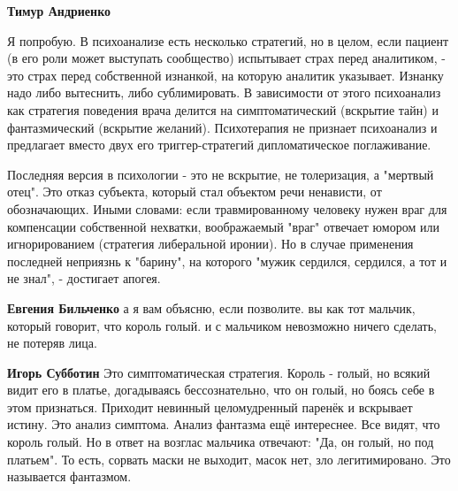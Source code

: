 \begin{itemize}
\begin{itemize}
 
\textbf{Тимур Андриенко} 

Я попробую. В психоанализе есть несколько стратегий, но в целом, если пациент
(в его роли может выступать сообщество) испытывает страх перед аналитиком, -
это страх перед собственной изнанкой, на которую аналитик указывает. Изнанку
надо либо вытеснить, либо сублимировать. В зависимости от этого психоанализ как
стратегия поведения врача делится на симптоматический (вскрытие тайн) и
фантазмический (вскрытие желаний). Психотерапия не признает психоанализ и
предлагает вместо двух его триггер-стратегий дипломатическое поглаживание.

Последняя версия в психологии - это не вскрытие, не толеризация, а "мертвый
отец". Это отказ субъекта, который стал объектом речи ненависти, от
обозначающих. Иными словами: если травмированному человеку нужен враг для
компенсации собственной нехватки, воображаемый "враг" отвечает юмором или
игнорированием (стратегия либеральной иронии). Но в случае применения последней
неприязнь к "барину", на которого "мужик сердился, сердился, а тот и не знал",
- достигает апогея.

 
\textbf{Евгения Бильченко} а я вам объясню, если позволите. вы как тот мальчик, который говорит, что король голый. и с мальчиком невозможно ничего сделать, не потеряв лица.

 
\textbf{Игорь Субботин} Это симптоматическая стратегия. Король - голый, но всякий видит его в платье, догадываясь бессознательно, что он голый, но боясь себе в этом признаться. Приходит невинный целомудренный паренёк и вскрывает истину. Это анализ симптома. Анализ фантазма ещё интереснее. Все видят, что король голый. Но в ответ на возглас мальчика отвечают: "Да, он голый, но под платьем". То есть, сорвать маски не выходит, масок нет, зло легитимировано. Это называется фантазмом.


\end{itemize}
\end{itemize}
